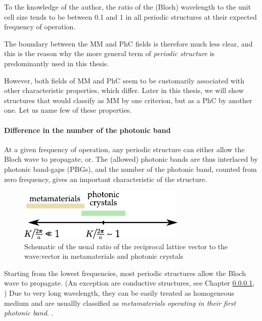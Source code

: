 To the knowledge of the author, the ratio of the (Bloch) wavelength to the unit cell size tends to be between 0.1 and 1 in all periodic structures at their expected frequency of operation.

The boundary between the MM and PhC fields is therefore much less clear, and this is the reason why the more general term of \textit{periodic structure} is predominantly used in this thesis. 

However, both fields of MM and PhC seem to be customarily associated with other characteristic properties, which differ. Later in this thesis, we will show structures that would classify as  MM by one criterion, but as a PhC by another one. Let us name few of these properties.

\paragraph{Difference in the number of the photonic band}%
At a given frequency of operation, any periodic structure can either allow the Bloch wave to propagate, or. The (allowed) photonic bands are thus interlaced by photonic band-gaps (PBGs), and the number of the photonic band, counted from zero frequency, gives an important characteristic of the structure.

\begin{figure}[h] \caption{Schematic of the usual ratio of the reciprocal lattice vector to the wave:vector in metamaterials and photonic crystals}  \centering \includegraphics[width=8cm]{img/mm-phc-diagram.pdf} \end{figure} 

	Starting from the lowest frequencies, most periodic structures allow the Bloch wave to propagate. (An exception are conductive structures, see Chapter \ref{}, )  Due to very long wavelength, they can be easily treated as homogeneous medium and are usuallly classified as \textit{metamaterials operating in their first photonic band}.     
\cite{richter1995, kadlec2008, sibik2010dp}.

